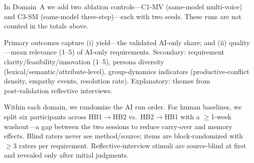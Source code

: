 \documentclass[acmsmall]{acmart}
\begin{document}
\begin{table}[ht]
  \centering
  \caption{Design matrix: domains $\times$ AI conditions $\times$ seeds and session counts.}
  \label{tab:design-matrix}
  \small
  \vspace{0.5ex}
{\footnotesize In Domain~A we add two ablation controls—C1-MV (same-model multi-voice) and C3-SM (same-model three-step)—each with two seeds. These runs are not counted in the totals above.}
\end{table}

Primary outcomes capture (i) yield—the validated AI‑only share; and (ii) quality—mean relevance (1--5) of AI‑only requirements.
Secondary: requirement clarity/feasibility/innovation (1--5), persona diversity (lexical/semantic/attribute‑level), group‑dynamics indicators (productive‑conflict density, empathy events, resolution rate). 
Explanatory: themes from post‑validation reflective interviews.

Within each domain, we randomize the AI run order. For human baselines, we split six participants across HB1$\rightarrow$HB2 vs.\ HB2$\rightarrow$HB1 with a $\geq$1‑week washout---a gap between the two sessions to reduce carry‑over and memory effects. Blind raters never see method/source; items are block‑randomized with $\geq$3 raters per requirement. Reflective‑interview stimuli are source‑blind at first and revealed only after initial judgments.
\end{document}
